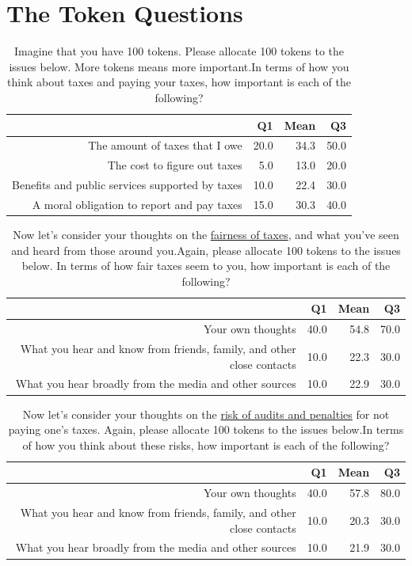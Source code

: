 \documentclass{NSF_proposal_mod}
\begin{document}
\clearpage
\section{The Token Questions}

\begin{table}[ht]
\centering
\begin{tabular}{rrrr}
  \hline
 & Q1 & Mean & Q3 \\ 
  \hline
The amount of taxes that I owe & 20.0 & 34.3 & 50.0 \\ 
  The cost to figure out taxes & 5.0 & 13.0 & 20.0 \\ 
  Benefits and public services supported by taxes & 10.0 & 22.4 & 30.0 \\ 
  A moral obligation to report and pay taxes & 15.0 & 30.3 & 40.0 \\ 
   \hline
\end{tabular}
\caption{Imagine that you have 100 tokens. Please allocate 100 tokens to the issues below. 
More tokens means more important.In terms of how you think about taxes and paying your taxes, how 
       important is each of the following?} 
\end{table}

\vspace{18pt}

\begin{table}[ht]
\centering
\begin{tabular}{rrrr}
  \hline
 & Q1 & Mean & Q3 \\ 
  \hline
	Your own thoughts & 40.0 & 54.8 & 70.0 \\ 
  What you hear and know from friends, family, and other close contacts & 10.0 & 22.3 & 30.0 \\ 
  What you hear broadly from the media and other sources & 10.0 & 22.9 & 30.0 \\ 
   \hline
\end{tabular}
\caption{Now let's consider your thoughts on the \underline{fairness of taxes}, and what 
you've seen and heard from those around you.Again, please allocate 100 tokens to the issues below.  
In terms of how fair taxes seem to you, how important is each of the following?} 
\end{table}

\vspace{18pt}

\begin{table}[ht]
\centering
\begin{tabular}{rrrr}
  \hline
 & Q1 & Mean & Q3 \\ 
  \hline
	Your own thoughts & 40.0 & 57.8 & 80.0 \\ 
  What you hear and know from friends, family, and other close contacts & 10.0 & 20.3 & 30.0 \\ 
  What you hear broadly from the media and other sources & 10.0 & 21.9 & 30.0 \\ 
   \hline
\end{tabular}
\caption{Now let's consider your thoughts on the \underline{risk of audits and penalties} for not paying 
one's taxes.  Again, please allocate 100 tokens to the issues below.In terms of how you think about these
risks, how important is each of the following?} 
\end{table}
\end{document}
